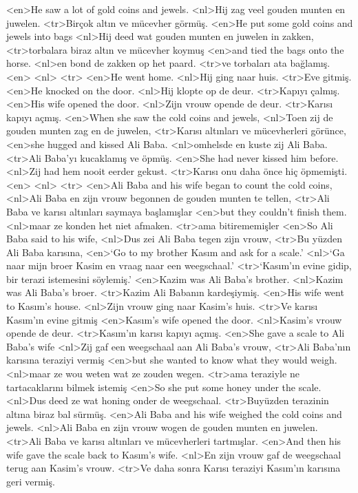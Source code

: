 <en>He saw a lot of gold coins and jewels.
<nl>Hij zag veel gouden munten en juwelen. 
<tr>Birçok altın ve mücevher görmüş.
<en>He put some gold coins and jewels into bags
<nl>Hij deed wat gouden munten en juwelen in zakken, 
<tr>torbalara biraz altın ve mücevher koymuş 
<en>and tied the bags onto the horse.
<nl>en bond de zakken op het paard. 
<tr>ve torbaları ata bağlamış.
<en>
<nl>
<tr>
<en>He went home.
<nl>Hij ging naar huis. 
<tr>Eve gitmiş.
<en>He knocked on the door.
<nl>Hij klopte op de deur.
<tr>Kapıyı çalmış.
<en>His wife opened the door.
<nl>Zijn vrouw opende de deur. 
<tr>Karısı kapıyı açmış.
<en>When she saw the cold coins and jewels,
<nl>Toen zij de gouden munten zag en de juwelen, 
<tr>Karısı altınları ve mücevherleri görünce,
<en>she hugged and kissed Ali Baba.
<nl>omhelsde en kuste zij Ali Baba.
<tr>Ali Baba’yı kucaklamış ve öpmüş.
<en>She had never kissed him before.
<nl>Zij had hem nooit eerder gekust.
<tr>Karısı onu daha önce hiç öpmemişti.
<en>
<nl>
<tr>
<en>Ali Baba and his wife began to count the cold coins,
<nl>Ali Baba en zijn vrouw begonnen de gouden munten te tellen, 
<tr>Ali Baba ve karısı altınları saymaya başlamışlar
<en>but they couldn’t finish them.
<nl>maar ze konden het niet afmaken.
<tr>ama bitirememişler
<en>So Ali Baba said to his wife,
<nl>Dus zei Ali Baba tegen zijn vrouw, 
<tr>Bu yüzden Ali Baba karısına,
<en>`Go to my brother Kasım and ask for a scale.'
<nl>`Ga naar mijn broer Kasim en vraag naar een weegschaal.'
<tr>`Kasım’ın evine gidip, bir terazi istemesini söylemiş.'
<en>Kazim was Ali Baba’s brother.
<nl>Kazim was Ali Baba's broer. 
<tr>Kazim Ali Babanın kardeşiymiş.
<en>His wife went to Kasım’s house.
<nl>Zijn vrouw ging naar Kasim's huis.
<tr>Ve karısı Kasım’ın evine gitmiş
<en>Kasım’s wife opened the door.
<nl>Kasim's vrouw opende de deur. 
<tr>Kasım’ın karısı kapıyı açmış.
<en>She gave a scale to Ali Baba’s wife
<nl>Zij gaf een weegschaal aan Ali Baba's vrouw,
<tr>Ali Baba’nın karısına teraziyi vermiş
<en>but she wanted to know what they would weigh.
<nl>maar ze wou weten wat ze zouden wegen. 
<tr>ama teraziyle ne tartacaklarını  bilmek istemiş
<en>So she put some honey under the scale.
<nl>Dus deed ze wat honing onder de weegschaal. 
<tr>Buyüzden terazinin altına biraz bal sürmüş.
<en>Ali Baba and his wife weighed the cold coins and jewels.
<nl>Ali Baba en zijn vrouw wogen de gouden munten en juwelen.
<tr>Ali Baba ve karısı altınları ve mücevherleri tartmışlar.
<en>And then his wife gave the scale back to Kasım’s wife.
<nl>En zijn vrouw gaf de weegschaal terug aan Kasim's vrouw. 
<tr>Ve daha sonra Karısı teraziyi Kasım’ın karısına geri vermiş.
